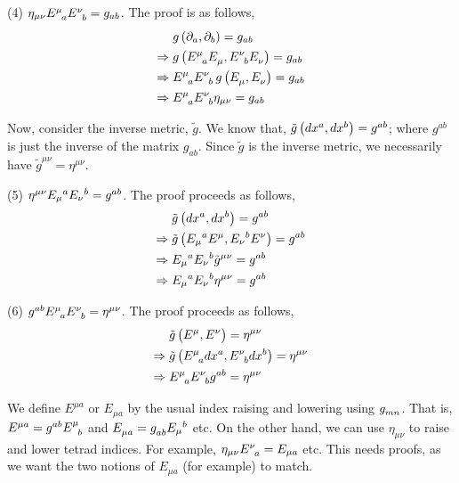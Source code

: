 (4) $\eta_{\mu\nu} \tt{E}{\mu}{a} \tt{E}{\nu}{b}  = g_{ab}$. The proof is as follows,
 \begin{align*}
	& g\lera{\partial_a, \partial_b} = g_{ab} \\
	\Rightarrow\; & g\lera{\tt{E}{\mu}{a} \tt{E}{}{\mu}, \tt{E}{\nu}{b} \tt{E}{}{\nu}} = g_{ab} \\
	\Rightarrow\; & \tt{E}{\mu}{a} \tt{E}{\nu}{b}\, g\lera{\tt{E}{}{\mu}, \tt{E}{}{\nu}} = g_{ab} \\
	\Rightarrow\; & \tt{E}{\mu}{a} \tt{E}{\nu}{b} \eta_{\mu\nu} = g_{ab}
\end{align*}

Now, consider the inverse metric, $\tilde{g}$. We know that, $\tilde{g}\left( dx^a, dx^b \right) = g^{ab}$; where $g^{ab}$ is just the inverse of the matrix $g_{ab}$. Since $\tilde{g}$ is the inverse metric, we necessarily have $\tilde{g}^{\mu\nu} = \eta^{\mu\nu}$.

(5) $ \eta^{\mu\nu}E_{\mu}{}^{a} E_{\nu}{}^{b}  = g^{ab} $. The proof proceeds as follows,
\begin{align*}
	& \tilde{g}\lera{dx^a, dx^b} = g^{ab} \\
	\Rightarrow\; & \tilde{g}\lera{\du{E}{\mu}{a} \tt{E}{\mu}{}, \du{E}{\nu}{b} \tt{E}{\nu}{}} = g^{ab} \\
	\Rightarrow\; & \du{E}{\mu}{a} \du{E}{\nu}{b} \tilde{g}^{\mu\nu} = g^{ab} \\
	\Rightarrow\; & \du{E}{\mu}{a} \du{E}{\nu}{b} \eta^{\mu\nu} = g^{ab}
\end{align*}

(6) $g^{ab} \tt{E}{\mu}{a} \tt{E}{\nu}{b}  = \eta^{\mu\nu}$.  The proof proceeds as follows,
\begin{align*}
	& \tilde{g}\lera{\tt{E}{\mu}{}, \tt{E}{\nu}{}} = \eta^{\mu\nu} \\
	\Rightarrow\; & \tilde{g}\lera{\tt{E}{\mu}{a} dx^a, \tt{E}{\nu}{b} dx^b} = \eta^{\mu\nu} \\
	\Rightarrow\; & \tt{E}{\mu}{a} \tt{E}{\nu}{b} g^{ab} = \eta^{\mu\nu}
\end{align*}



We define $E^{\mu a}$ or $E_{\mu a}$ by the usual index raising and lowering using $ \tt{g}{}{mn}$. That is, $E^{\mu a} = g^{ab} \tt{E}{\mu}{b} $ and $ \tt{E}{}{ \mu a} = \tt{g}{}{ab} E_\mu{}^b$ etc. On the other hand, we can use $\eta_{\mu\nu}$ to raise and lower tetrad indices. For example, $\eta_{\mu\nu} \tt{E}{\nu}{a} = E_{\mu a}$ etc. This needs proofs, as we want the two notions of $ E_{ \mu a}$ (for example) to match.


